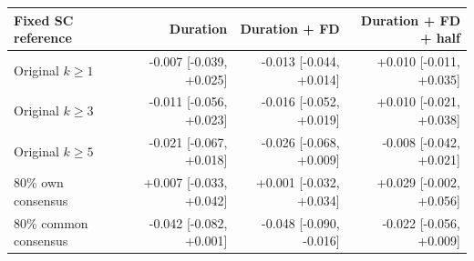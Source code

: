 \begin{tabular}{lrrr}
\toprule
Fixed SC reference & Duration & Duration + FD & Duration + FD + half \\
\midrule
Original $k\geq1$ & -0.007 [-0.039, +0.025] & -0.013 [-0.044, +0.014] & +0.010 [-0.011, +0.035] \\
Original $k\geq3$ & -0.011 [-0.056, +0.023] & -0.016 [-0.052, +0.019] & +0.010 [-0.021, +0.038] \\
Original $k\geq5$ & -0.021 [-0.067, +0.018] & -0.026 [-0.068, +0.009] & -0.008 [-0.042, +0.021] \\
80\% own consensus & +0.007 [-0.033, +0.042] & +0.001 [-0.032, +0.034] & +0.029 [-0.002, +0.056] \\
80\% common consensus & -0.042 [-0.082, +0.001] & -0.048 [-0.090, -0.016] & -0.022 [-0.056, +0.009] \\
\bottomrule
\end{tabular}
